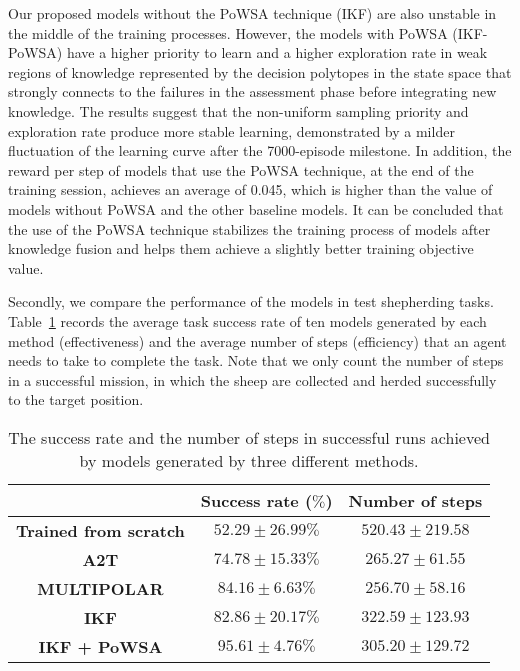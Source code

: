 \documentclass[lettersize,journal]{IEEEtran}
\begin{document}
Our proposed models without the PoWSA technique (IKF) are also unstable in the middle of the training processes. However, the models with PoWSA (IKF-PoWSA) have a higher priority to learn and a higher exploration rate in weak regions of knowledge represented by the decision polytopes in the state space that strongly connects to the failures in the assessment phase before integrating new knowledge. The results suggest that the non-uniform sampling priority and exploration rate produce more stable learning, demonstrated by a milder fluctuation of the learning curve after the 7000-episode milestone. In addition, the reward per step of models that use the PoWSA technique, at the end of the training session, achieves an average of 0.045, which is higher than the value of models without PoWSA and the other baseline models. It can be concluded that the use of the PoWSA technique stabilizes the training process of models after knowledge fusion and helps them achieve a slightly better training objective value.


Secondly, we compare the performance of the models in test shepherding tasks.  Table~\ref{tab:shepherding-performance} records the average task success rate of ten models generated by each method (effectiveness) and the average number of steps (efficiency) that an agent needs to take to complete the task. Note that we only count the number of steps in a successful mission, in which the sheep are collected and herded successfully to the target position.

\begin{table}[!b]
\vspace{-1em}
\small
\centering
\caption{The success rate and the number of steps in successful runs achieved by models generated by three different methods.}
\label{tab:shepherding-performance}
\begin{tabular}{ccc}
    & \textbf{Success rate} ($\%$) & \textbf{Number of steps} \\ \hline
 \textbf{Trained from scratch}
 & $52.29\pm26.99\%$    & $520.43\pm219.58$  \\
 \textbf{A2T}
 & $74.78\pm15.33\%$    & $265.27\pm61.55$  \\
  \textbf{MULTIPOLAR}
 & $84.16\pm6.63\%$    & $256.70\pm58.16$  \\
 \textbf{IKF}
 & $82.86\pm20.17\%$    & $322.59\pm123.93$  \\
 \textbf{IKF + PoWSA}
 & $\mathbf{95.61\pm4.76\%}$     & $305.20\pm129.72$

\end{tabular}
\end{table}
\end{document}
